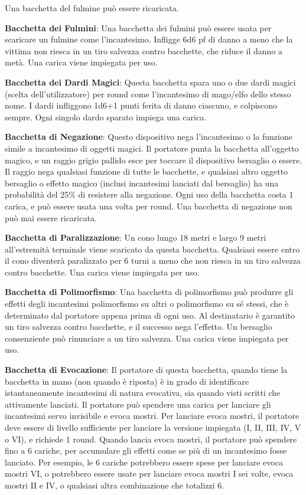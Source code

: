 \documentclass{article}
\begin{document}
\begin{multicols}{2}
Una bacchetta del fulmine può essere ricaricata.

\textbf{Bacchetta dei Fulmini}: Una bacchetta dei fulmini può essere usata per scaricare un fulmine come l'incantesimo. Infligge 6d6 pf di danno a meno che la vittima non riesca in un tiro salvezza contro bacchette, che riduce il danno a metà. Una carica viene impiegata per uso.

\textbf{Bacchetta dei Dardi Magici}: Questa bacchetta spara uno o due dardi magici (scelta dell'utilizzatore) per round come l'incantesimo di mago/elfo dello stesso nome. I dardi infliggono 1d6+1 punti ferita di danno ciascuno, e colpiscono sempre. Ogni singolo dardo sparato impiega una carica.

\textbf{Bacchetta di Negazione}: Questo dispositivo nega l'incantesimo o la funzione simile a incantesimo di oggetti magici. Il portatore punta la bacchetta all'oggetto magico, e un raggio grigio pallido esce per toccare il dispositivo bersaglio o essere. Il raggio nega qualsiasi funzione di tutte le bacchette, e qualsiasi altro oggetto bersaglio o effetto magico (inclusi incantesimi lanciati dal bersaglio) ha una probabilità del 25\% di resistere alla negazione. Ogni uso della bacchetta costa 1 carica, e può essere usata una volta per round. Una bacchetta di negazione non può mai essere ricaricata.

\textbf{Bacchetta di Paralizzazione}: Un cono lungo 18 metri e largo 9 metri all'estremità terminale viene scaricato da questa bacchetta. Qualsiasi essere entro il cono diventerà paralizzato per 6 turni a meno che non riesca in un tiro salvezza contro bacchette. Una carica viene impiegata per uso.

\textbf{Bacchetta di Polimorfismo}: Una bacchetta di polimorfismo può produrre gli effetti degli incantesimi polimorfismo su altri o polimorfismo su sé stessi, che è determinato dal portatore appena prima di ogni uso. Al destinatario è garantito un tiro salvezza contro bacchette, e il successo nega l'effetto. Un bersaglio consenziente può rinunciare a un tiro salvezza. Una carica viene impiegata per uso.

\textbf{Bacchetta di Evocazione}: Il portatore di questa bacchetta, quando tiene la bacchetta in mano (non quando è riposta) è in grado di identificare istantaneamente incantesimi di natura evocativa, sia quando visti scritti che attivamente lanciati. Il portatore può spendere una carica per lanciare gli incantesimi servo invisibile e evoca mostri. Per lanciare evoca mostri, il portatore deve essere di livello sufficiente per lanciare la versione impiegata (I, II, III, IV, V o VI), e richiede 1 round. Quando lancia evoca mostri, il portatore può spendere fino a 6 cariche, per accumulare gli effetti come se più di un incantesimo fosse lanciato. Per esempio, le 6 cariche potrebbero essere spese per lanciare evoca mostri VI, o potrebbero essere usate per lanciare evoca mostri I sei volte, evoca mostri II e IV, o qualsiasi altra combinazione che totalizzi 6.


\end{multicols}
\end{document}
